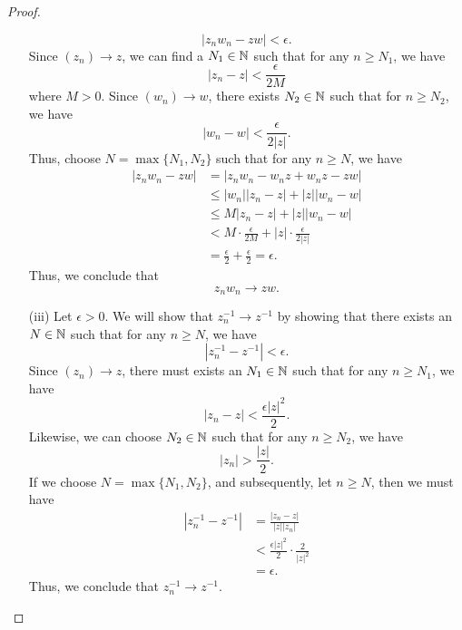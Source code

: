 \documentclass[a4paper]{report}
\begin{document}
\begin{proof}
\begin{enumerate}
        \[  | {z}_{n} {w}_{n} - zw  |  < \epsilon. \]
        Since \( ({z}_{n}) \to z  \), we can find a \( {N}_{1} \in \mathbb{N}  \) such that for any \( n \geq {N}_{1} \), we have   
        \[  | {z}_{n} - z  |  < \frac{ \epsilon  }{  2 M   }   \]
        where \( M > 0  \).
        Since \( ({w}_{n})  \to w \), there exists \( {N}_{2} \in \mathbb{N}  \) such that for \( n \geq {N}_{2} \), we have 
        \[  | {w}_{n} - w  | < \frac{ \epsilon  }{  2 | z  |  }.  \]
        Thus, choose \( N = \max \{ {N}_{1}, {N}_{2} \}  \) such that for any \( n \geq N  \), we have
        \begin{align*}
            | {z}_{n} {w}_{n} - zw  |  &= | {z}_{n} {w}_{n} - {w}_{n} z + {w}_{n} z - zw  |  \\
                                       &\leq | {w}_{n}  | | {z}_{n} - z  | + | z  |  | {w}_{n} - w   | \\
                                       &\leq M | {z}_{n} - z  |  + | z  |  | {w}_{n} - w  |  \\
                                       &< M \cdot \frac{ \epsilon  }{ 2 M  }  + | z  |  \cdot \frac{ \epsilon  }{ 2 | z  |  }  \\
                                       &= \frac{ \epsilon  }{  2 }  + \frac{ \epsilon  }{  2  }  = \epsilon.
        \end{align*}
        Thus, we conclude that 
        \[ {z}_{n} {w}_{n} \to z w.  \]
    \item[(iii)] Let \( \epsilon > 0  \). We will show that \( {z}_{n}^{-1} \to z^{-1} \) by showing that there exists an \( N \in \mathbb{N}  \) such that for any \( n \geq N  \), we have 
        \[  | {z}_{n}^{-1} - z^{-1} | < \epsilon. \]
    Since \( ({z}_{n}) \to z  \), there must exists an \( {N}_{1} \in \mathbb{N}   \) such that for any \( n \geq {N}_{1}  \), we have
    \[  | {z}_{n} - z  |  < \frac{ \epsilon | z  |^{2} }{ 2 }.  \]
    Likewise, we can choose \( {N}_{2} \in \mathbb{N}  \) such that for any \( n \geq {N}_{2} \), we have
    \[  | {z}_{n}  |  > \frac{ | z |  }{ 2 }.  \]
    If we choose \( N = \max \{ {N}_{1}, {N}_{2} \}  \), and subsequently, let \( n \geq N  \), then we must have
    \begin{align*}
      | {z}_{n}^{-1} - z^{-1} |   &= \frac{ | {z}_{n} - z  |  }{  | z  |  | {z}_{n} |  } \\
                                  &< \frac{ \epsilon | z |^{2}  }{ 2  } \cdot \frac{ 2  }{  | z |^{2}  } \\ 
                                  &= \epsilon.
    \end{align*}
    Thus, we conclude that \( {z}_{n}^{-1} \to z^{-1} \).
\end{enumerate}
\end{proof}
\end{document}
